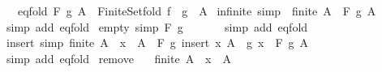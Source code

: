 \begin{isabellebody}
\ \ \ eq{\isacharunderscore}{\kern0pt}fold{\isacharcolon}{\kern0pt}\ {\isachardoublequoteopen}F\ g\ A\ {\isacharequal}{\kern0pt}\ Finite{\isacharunderscore}{\kern0pt}Set{\isachardot}{\kern0pt}fold\ {\isacharparenleft}{\kern0pt}f\ {\isasymcirc}\ g{\isacharparenright}{\kern0pt}\ \ A{\isachardoublequoteclose}\isanewline
\isanewline
{}\isamarkupfalse%
\ infinite\ {\isacharbrackleft}{\kern0pt}simp{\isacharbrackright}{\kern0pt}{\isacharcolon}{\kern0pt}\ {\isachardoublequoteopen}{\isasymnot}\ finite\ A\ {\isasymLongrightarrow}\ F\ g\ A\ {\isacharequal}{\kern0pt}\ \isanewline
%
\isadelimproof
\ \ %
\endisadelimproof
%
\isatagproof
{}\isamarkupfalse%
\ {\isacharparenleft}{\kern0pt}simp\ add{\isacharcolon}{\kern0pt}\ eq{\isacharunderscore}{\kern0pt}fold{\isacharparenright}{\kern0pt}%
\endisatagproof
{\isafoldproof}%
%
\isadelimproof
\isanewline
%
\endisadelimproof
\isanewline
{}\isamarkupfalse%
\ empty\ {\isacharbrackleft}{\kern0pt}simp{\isacharbrackright}{\kern0pt}{\isacharcolon}{\kern0pt}\ {\isachardoublequoteopen}F\ g\ {\isacharbraceleft}{\kern0pt}{\isacharbraceright}{\kern0pt}\ {\isacharequal}{\kern0pt}\ \isanewline
%
\isadelimproof
\ \ %
\endisadelimproof
%
\isatagproof
{}\isamarkupfalse%
\ {\isacharparenleft}{\kern0pt}simp\ add{\isacharcolon}{\kern0pt}\ eq{\isacharunderscore}{\kern0pt}fold{\isacharparenright}{\kern0pt}%
\endisatagproof
{\isafoldproof}%
%
\isadelimproof
\isanewline
%
\endisadelimproof
\isanewline
{}\isamarkupfalse%
\ insert\ {\isacharbrackleft}{\kern0pt}simp{\isacharbrackright}{\kern0pt}{\isacharcolon}{\kern0pt}\ {\isachardoublequoteopen}finite\ A\ {\isasymLongrightarrow}\ x\ {\isasymnotin}\ A\ {\isasymLongrightarrow}\ F\ g\ {\isacharparenleft}{\kern0pt}insert\ x\ A{\isacharparenright}{\kern0pt}\ {\isacharequal}{\kern0pt}\ g\ x\ \isactrlbold {\isacharasterisk}{\kern0pt}\ F\ g\ A{\isachardoublequoteclose}\isanewline
%
\isadelimproof
\ \ %
\endisadelimproof
%
\isatagproof
{}\isamarkupfalse%
\ {\isacharparenleft}{\kern0pt}simp\ add{\isacharcolon}{\kern0pt}\ eq{\isacharunderscore}{\kern0pt}fold{\isacharparenright}{\kern0pt}%
\endisatagproof
{\isafoldproof}%
%
\isadelimproof
\isanewline
%
\endisadelimproof
\isanewline
{}\isamarkupfalse%
\ remove{\isacharcolon}{\kern0pt}\isanewline
\ \ \ {\isachardoublequoteopen}finite\ A{\isachardoublequoteclose}\ \ {\isachardoublequoteopen}x\ {\isasymin}\ A{\isachardoublequoteclose}\isanewline

\end{isabellebody}
